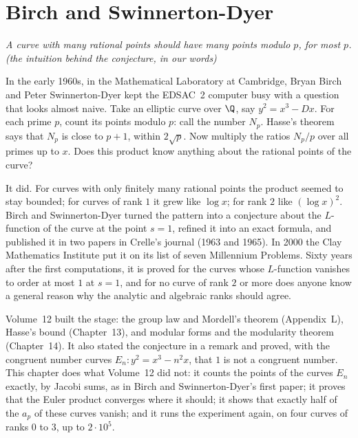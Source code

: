 \chapter{Birch and Swinnerton-Dyer}\label{conjectures:ch:bsd}

\begin{center}\itshape
A curve with many rational points should have many points modulo $p$, for most $p$.\\
\upshape(the intuition behind the conjecture, in our words)
\end{center}

In the early 1960s, in the Mathematical Laboratory at Cambridge, Bryan Birch and Peter Swinnerton-Dyer kept the EDSAC~2 computer busy with a question that
looks almost naive. Take an elliptic curve over $\Q$, say $y^2=x^3-Dx$. For each prime $p$, count its points modulo $p$: call the number $N_p$. Hasse's theorem
says that $N_p$ is close to $p+1$, within $2\sqrt p$. Now multiply the ratios $N_p/p$ over all primes up to $x$. Does this product know anything about the
rational points of the curve?

It did. For curves with only finitely many rational points the product seemed to stay bounded; for curves of rank $1$ it grew like $\log x$; for rank $2$ like
$(\log x)^2$. Birch and Swinnerton-Dyer turned the pattern into a conjecture about the $L$-function of the curve at the point $s=1$, refined it into an exact
formula, and published it in two papers in Crelle's journal (1963 and 1965). In 2000 the Clay Mathematics Institute put it on its list of seven Millennium
Problems. Sixty years after the first computations, it is proved for the curves whose $L$-function vanishes to order at most $1$ at $s=1$, and for no curve of rank $2$ or more
does anyone know a general reason why the analytic and algebraic ranks should agree.

Volume~12 built the stage: the group law and Mordell's theorem (Appendix~L), Hasse's bound (Chapter~13), and modular forms and the modularity theorem
(Chapter~14). It also stated the conjecture in a remark and proved, with the congruent number curves $E_n:y^2=x^3-n^2x$, that $1$ is not a congruent number.
This chapter does what Volume~12 did not: it counts the points of the curves $E_n$ exactly, by Jacobi sums, as in Birch and Swinnerton-Dyer's first paper; it
proves that the Euler product converges where it should; it shows that exactly half of the $a_p$ of these curves vanish; and it runs the experiment again,
on four curves of ranks $0$ to $3$, up to $2\cdot10^5$.

